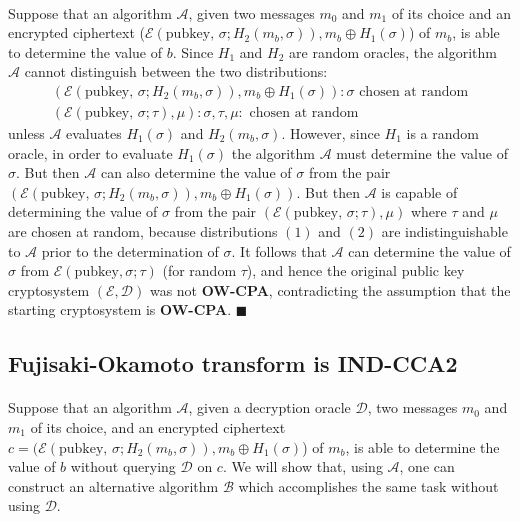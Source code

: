\documentclass[letterpaper,12pt,oneside,onecolumn]{report}
\begin{document}
 \paragraph{}
 Suppose that an algorithm $\mathcal{A}$, given two  messages $m_0$ and $m_1$ of its choice and an encrypted ciphertext ($\mathcal{E}(\text{pubkey, }\sigma;H_2(m_b,\sigma)), m_b \oplus H_1(\sigma)$) of $m_b$, is able to determine the value of $b$. Since $H_1$ and $H_2$ are random oracles, the algorithm $\mathcal{A}$ cannot distinguish between the two distributions:
 \begin{align}
 (\mathcal{E}(\text{pubkey, }\sigma;H_2(m_b,\sigma)), m_b \oplus H_1(\sigma)) : \sigma \text{ chosen at random} \\
 (\mathcal{E}(\text{pubkey, }\sigma;\tau), \mu) : \sigma, \tau, \mu : \text{ chosen at random}
 \end{align}
 unless $\mathcal{A}$ evaluates $H_1(\sigma)$ and $H_2(m_b, \sigma)$. However, since $H_1$ is a random oracle, in order to evaluate $H_1(\sigma)$ the algorithm $\mathcal{A}$ must determine the value of $\sigma$. But then $\mathcal{A}$ can also determine the value of $\sigma$ from the pair $(\mathcal{E}(\text{pubkey, }\sigma;H_2(m_b,\sigma)), m_b \oplus H_1(\sigma))$. But then $\mathcal{A}$ is capable of determining the value of $\sigma$ from the pair $(\mathcal{E}(\text{pubkey, }\sigma;\tau), \mu)$ where $\tau$ and $\mu$ are chosen at random, because distributions $(1)$ and $(2)$ are indistinguishable to $\mathcal{A}$ prior to the determination of $\sigma$. It follows that $\mathcal{A}$ can determine the value of $\sigma$ from $\mathcal{E}(\text{pubkey},\sigma; \tau)$ (for random $\tau$), and hence the original public key cryptosystem $(\mathcal{E}, \mathcal{D})$ was not \textbf{OW-CPA}, contradicting the assumption that the starting cryptosystem is \textbf{OW-CPA}. $\blacksquare$
\subsection*{Fujisaki-Okamoto transform is IND-CCA2}
\paragraph{}
Suppose that an algorithm $\mathcal{A}$, given a decryption oracle $\mathcal{D}$, two messages $m_0$ and $m_1$ of its choice, and an encrypted ciphertext $c = (\mathcal{E}(\text{pubkey, }\sigma;H_2(m_b,\sigma)), m_b \oplus H_1(\sigma)$) of $m_b$, is able to determine the value of $b$ without querying $\mathcal{D}$ on $c$. We will show that, using $\mathcal{A}$, one can construct an alternative algorithm $\mathcal{B}$ which accomplishes the same task without using $\mathcal{D}$.
\end{document}
